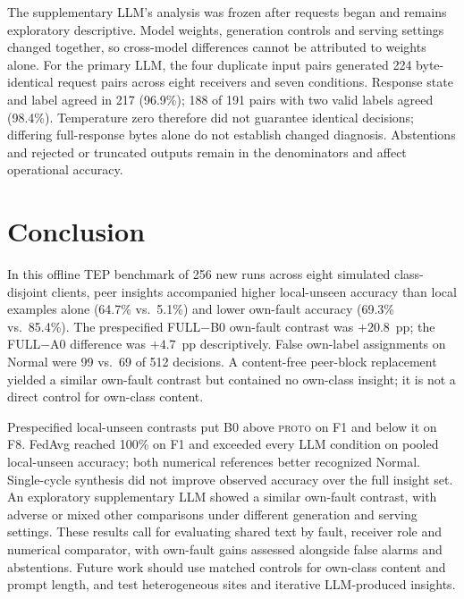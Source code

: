 \documentclass[conference]{IEEEtran}
\newcommand{\TEP}{TEP}
\newcommand{\PROTO}{\textsc{proto}}
\newcommand{\cond}[1]{\textsf{#1}}
\newcommand{\lu}{local-unseen}
\begin{document}
The supplementary LLM's analysis was frozen after requests began and remains exploratory descriptive. Model weights, generation controls and serving settings changed together, so cross-model differences cannot be attributed to weights alone. For the primary LLM, the four duplicate input pairs generated 224 byte-identical request pairs across eight receivers and seven conditions. Response state and label agreed in 217 (96.9\%); 188 of 191 pairs with two valid labels agreed (98.4\%). Temperature zero therefore did not guarantee identical decisions; differing full-response bytes alone do not establish changed diagnosis. Abstentions and rejected or truncated outputs remain in the denominators and affect operational accuracy.

\section{Conclusion}
\label{sec:conclusion}
In this offline \TEP{} benchmark of 256 new runs across eight simulated class-disjoint clients, peer insights accompanied higher \lu{} accuracy than local examples alone (64.7\% vs.\ 5.1\%) and lower own-fault accuracy (69.3\% vs.\ 85.4\%). The prespecified \cond{FULL}$-$\cond{B0} own-fault contrast was $+20.8$~pp; the \cond{FULL}$-$\cond{A0} difference was $+4.7$~pp descriptively. False own-label assignments on Normal were 99 vs.\ 69 of 512 decisions. A content-free peer-block replacement yielded a similar own-fault contrast but contained no own-class insight; it is not a direct control for own-class content.

Prespecified \lu{} contrasts put \cond{B0} above \PROTO{} on F1 and below it on F8. FedAvg reached 100\% on F1 and exceeded every LLM condition on pooled \lu{} accuracy; both numerical references better recognized Normal. Single-cycle synthesis did not improve observed accuracy over the full insight set. An exploratory supplementary LLM showed a similar own-fault contrast, with adverse or mixed other comparisons under different generation and serving settings. These results call for evaluating shared text by fault, receiver role and numerical comparator, with own-fault gains assessed alongside false alarms and abstentions. Future work should use matched controls for own-class content and prompt length, and test heterogeneous sites and iterative LLM-produced insights.
\end{document}
